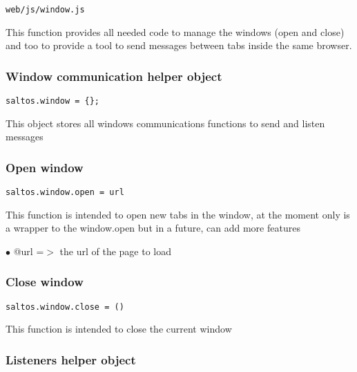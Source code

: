 \documentclass[a4paper]{article}
\begin{document}
\begin{lstlisting}
web/js/window.js
\end{lstlisting}

This function provides all needed code to manage the windows (open and close) and too
to provide a tool to send messages between tabs inside the same browser.

\hypertarget{toc862}{}
\subsubsection{Window communication helper object}

\begin{lstlisting}
saltos.window = {};
\end{lstlisting}

This object stores all windows communications functions to send and listen messages

\hypertarget{toc863}{}
\subsubsection{Open window}

\begin{lstlisting}
saltos.window.open = url
\end{lstlisting}

This function is intended to open new tabs in the window, at the moment only is a wrapper to
the window.open but in a future, can add more features

\begin{compactitem}
\item[\color{myblue}$\bullet$] @url =$>$ the url of the page to load
\end{compactitem}

\hypertarget{toc864}{}
\subsubsection{Close window}

\begin{lstlisting}
saltos.window.close = ()
\end{lstlisting}

This function is intended to close the current window

\hypertarget{toc865}{}
\subsubsection{Listeners helper object}
\end{document}
